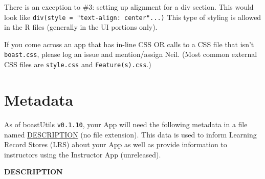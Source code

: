 \documentclass[
]{book}
\begin{document}
There is an exception to \#3: setting up alignment for a div section. This would look like \texttt{div(style\ =\ "text-align:\ center"...)} This type of styling is allowed in the R files (generally in the UI portions only).

If you come across an app that has in-line CSS OR calls to a CSS file that isn't \texttt{boast.css}, please log an issue and mention/assign Neil. (Most common external CSS files are \texttt{style.css} and \texttt{Feature(s).css}.)

\hypertarget{metadata}{%
\section{Metadata}\label{metadata}}

As of boastUtils \texttt{v0.1.10}, your App will need the following metadata in a file named \href{https://github.com/EducationShinyAppTeam/App_Template/blob/master/DESCRIPTION}{DESCRIPTION} (no file extension). This data is used to inform Learning Record Stores (LRS) about your App as well as provide information to instructors using the Instructor App (unreleased).

\textbf{DESCRIPTION}
\end{document}
